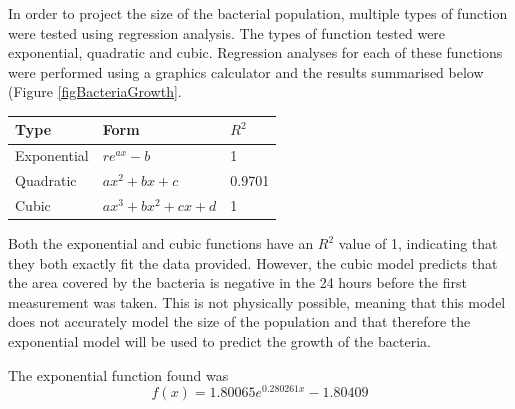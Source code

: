 \documentclass[a4paper]{article}
\theoremstyle{definition}
\begin{document}
        In order to project the size of the bacterial population, multiple types of function were tested using regression analysis. The types of function tested were exponential, quadratic and cubic. Regression analyses for each of these functions were performed using a graphics calculator and the results summarised below (Figure \ref{figBacteriaGrowth}.
        
        \begin{center}
            \begin{tabular}{@{}lll@{}}
                \toprule
                Type        & Form                   & $R^2$  \\ \midrule
                Exponential & $re^{ax}-b$            & 1      \\
                Quadratic   & $ax^2 + bx + c$        & 0.9701 \\
                Cubic       & $ax^3 + bx^2 + cx + d$ & 1      \\ \bottomrule
            \end{tabular}
        \end{center}

        Both the exponential and cubic functions have an $R^2$ value of 1, indicating that they both exactly fit the data provided. However, the cubic model predicts that the area covered by the bacteria is negative in the 24 hours before the first measurement was taken. This is not physically possible, meaning that this model does not accurately model the size of the population and that therefore the exponential model will be used to predict the growth of the bacteria.

        The exponential function found was
        \begin{equation}
            f(x) = 1.80065e^{0.280261x}-1.80409
        \end{equation}
\end{document}
